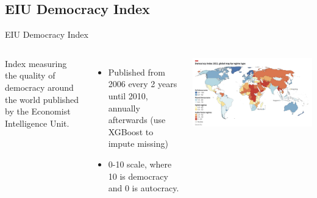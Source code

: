 \documentclass[10pt]{beamer}
\begin{document}
\subsection{EIU Democracy Index}
\begin{frame}{EIU Democracy Index}
    \begin{columns}
        Index measuring the quality of democracy around the world published by the Economist Intelligence Unit.
        \begin{itemize}
            \item Published from 2006 every 2 years until 2010, annually afterwards (use XGBoost to impute missing)
            \item 0-10 scale, where 10 is democracy and 0 is autocracy.
        \end{itemize}

        \centering
        \includegraphics[width=\textwidth]{../charts/eiu_2023.jpg}
    \end{columns}
    
\end{frame}
\end{document}
